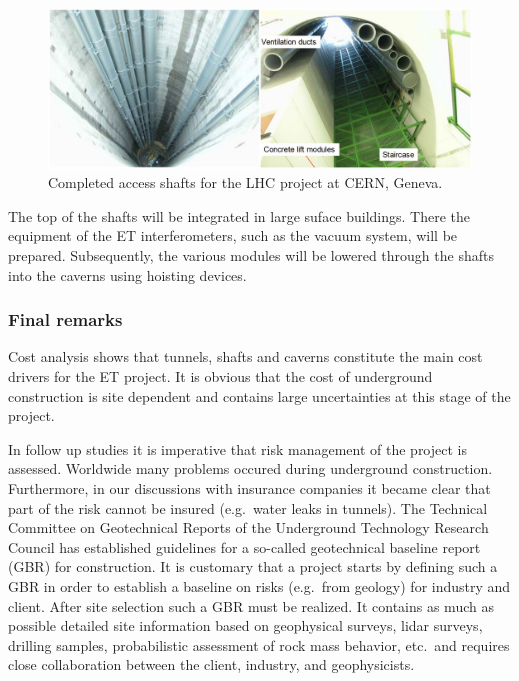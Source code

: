 \begin{figure}[htbp!]
\centering
\includegraphics[width=16cm]{./Sec_SiteInfra/Figures/cmsshaft.jpg}
\caption{Completed access shafts for the LHC project at CERN, Geneva.}
\label{fig:cmsshaft}
\end{figure}
The top of the shafts will be integrated in large suface buildings. There
the equipment of the ET interferometers, such as the vacuum system, will
be prepared. Subsequently, the various modules will be lowered through the
shafts into the caverns using hoisting devices.

\subsubsection{Final remarks}

Cost analysis shows that tunnels, shafts and caverns constitute the main cost drivers 
for the ET project. It is obvious that the cost of underground construction is site dependent
and contains large uncertainties at this stage of the project.

In follow up studies it is imperative that risk management of the project is assessed.
Worldwide many problems occured during underground construction. Furthermore,
in our discussions with insurance companies it became clear that part of the
risk cannot be insured (e.g.\ water leaks in tunnels). The Technical Committee on
Geotechnical Reports of the Underground Technology Research Council has
established guidelines for a so-called geotechnical baseline report (GBR) for construction.
It is customary that a project starts by defining such a GBR in order to establish
a baseline on risks (e.g.\ from geology) for industry and client. After
site selection such a GBR must be realized. It contains as much as possible detailed
site information based on geophysical surveys, lidar surveys, drilling samples,
probabilistic assessment of rock mass behavior, etc.\ and requires close collaboration
between the client, industry, and geophysicists.



